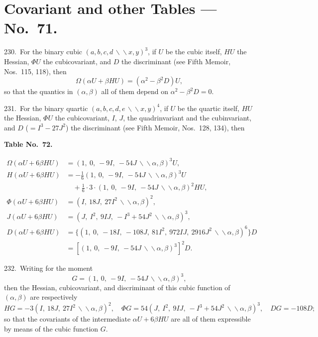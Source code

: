 \documentclass[11pt,a4paper]{article}
\theoremstyle{plain}
\theoremstyle{definition}
\theoremstyle{remark}
\begin{document}
\smallskip

\section*{Covariant and other Tables --- No.~71.}

230.\ For the binary cubic $(a,b,c,d\,\backslash\!\!\backslash x,y)^3$, if $U$ be the cubic itself, $HU$ the Hessian, $\Phi U$ the cubicovariant, and $D$ the discriminant (see Fifth Memoir, Nos.~115, 118), then
\[
\Omega(\alpha U+\beta HU) = (\alpha^2-\beta^2 D)U,
\]
so that the quantics in $(\alpha,\beta)$ all of them depend on $\alpha^2-\beta^2 D=0$.

231.\ For the binary quartic $(a,b,c,d,e\,\backslash\!\!\backslash x,y)^4$, if $U$ be the quartic itself, $HU$ the Hessian, $\Phi U$ the cubicovariant, $I$, $J$, the quadrinvariant and the cubinvariant, and $D$ ($=I^3-27J^2$) the discriminant (see Fifth Memoir, Nos.~128, 134), then

\begin{center}
\textbf{Table No.~72.}
\end{center}
\begin{align*}
\Omega(\alpha U+6\beta HU) &= (1,\ 0,\ -9I,\ -54J\,\backslash\!\!\backslash\alpha,\beta)^3 U,\\
H(\alpha U+6\beta HU) &= -\tfrac{1}{6}(1,\ 0,\ -9I,\ -54J\,\backslash\!\!\backslash\alpha,\beta)^3 U\\
&\quad + \tfrac{1}{6}\cdot 3\cdot(1,\ 0,\ -9I,\ -54J\,\backslash\!\!\backslash\alpha,\beta)^2 HU,\\
\Phi(\alpha U+6\beta HU) &= (I,\ 18J,\ 27I^2\,\backslash\!\!\backslash\alpha,\beta)^2,\\
J(\alpha U+6\beta HU) &= (J,\ I^2,\ 9IJ,\ -I^3+54J^2\,\backslash\!\!\backslash\alpha,\beta)^3,\\
D(\alpha U+6\beta HU) &= \{(1,\ 0,\ -18I,\ -108J,\ 81I^2,\ 972IJ,\ 2916J^2\,\backslash\!\!\backslash\alpha,\beta)^6\}D\\
&= [(1,\ 0,\ -9I,\ -54J\,\backslash\!\!\backslash\alpha,\beta)^3]^2 D.
\end{align*}

232.\ Writing for the moment
\[
G = (1,\ 0,\ -9I,\ -54J\,\backslash\!\!\backslash\alpha,\beta)^3,
\]
then the Hessian, cubicovariant, and discriminant of this cubic function of $(\alpha,\beta)$ are respectively
\[
HG = -3(I,\ 18J,\ 27I^2\,\backslash\!\!\backslash\alpha,\beta)^2,\quad \Phi G = 54(J,\ I^2,\ 9IJ,\ -I^3+54J^2\,\backslash\!\!\backslash\alpha,\beta)^3,\quad DG = -108D;
\]
so that the covariants of the intermediate $\alpha U+6\beta HU$ are all of them expressible by means of the cubic function $G$.
\end{document}
